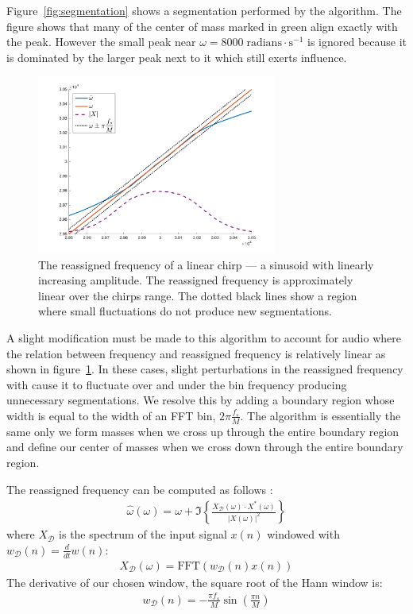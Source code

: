 \documentclass[12pt]{article}
\newcommand{\fft}{\text{FFT}}
\begin{document}
Figure~\ref{fig:segmentation} shows a segmentation performed by the algorithm.
The figure shows that many of the center of mass marked in green align exactly with the peak. 
However the small peak near $\omega = 8000 \;\text{radians}\cdot \text{s}^{-1}$ is ignored because it is dominated by the larger peak next to it which still exerts influence.

\begin{figure}[!h]
  \begin{center}
  \includegraphics[width=0.7\textwidth]{figures/ReassignedFreqChri1}
  \caption{The reassigned frequency of a linear chirp --- a sinusoid with linearly increasing amplitude. The reassigned frequency is approximately linear over the chirps range. The dotted black lines show a region where small fluctuations do not produce new segmentations.}
    \label{fig:chirp}
  \end{center}
\end{figure}

A slight modification must be made to this algorithm to account for audio where the relation between frequency and reassigned frequency is relatively linear as shown in figure~\ref{fig:chirp}. In these cases, slight perturbations in the reassigned frequency with cause it to fluctuate over and under the bin frequency producing unnecessary segmentations.
We resolve this by adding a boundary region whose width is equal to the width of an FFT bin, $2\pi \frac{f_s}{M}$.
The algorithm is essentially the same only we form masses when we cross up through the entire boundary region
and define our center of masses when we cross down through the entire boundary region.

The reassigned frequency can be computed as follows \cite{reassignment}:
\begin{align}
  \hat{\omega}(\omega) = 
  \omega + 
  \Im\left\{%
    \frac{X_\mathcal{D}(\omega)\cdot X^*(\omega)}{|X(\omega)|^2}
  \right\}
\end{align}
where $X_\mathcal{D}$ is the spectrum of the input signal $x(n)$ windowed with
$w_\mathcal{D}(n) = \frac{d}{dt}w(n)$:
\begin{align}
  X_\mathcal{D}(\omega) = \fft\left(w_\mathcal{D}(n)x(n)\right)
\end{align}
The derivative of our chosen window, the square root of the Hann window is:
\begin{align}
   w_\mathcal{D}(n) = -\frac{\pi f_s}{M}\sin\left(\frac{\pi n}{M}\right)
\end{align}
\end{document}
